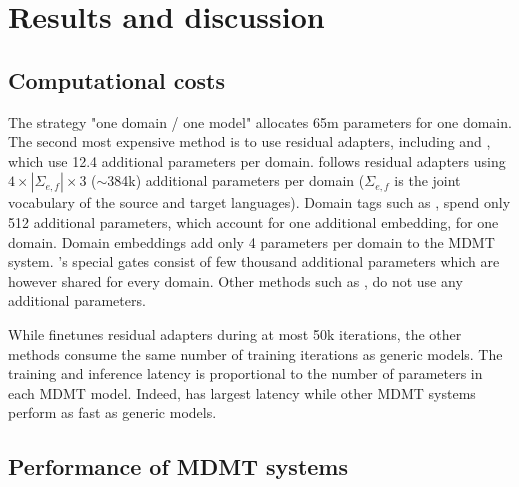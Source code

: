 \section{Results and discussion \label{sec:results-chap4}}

\subsection{Computational costs}
\label{ssec:cost-chap4}
The strategy "one domain / one model" allocates 65m parameters for one domain. The second most expensive method is to use residual adapters, including  and , which use 12.4 additional parameters per domain.  follows residual adapters using $4 \times |\Sigma_{e,f}| \times 3$ ($\sim$384k) additional parameters per domain ($\Sigma_{e,f}$ is the joint vocabulary of the source and target languages). Domain tags such as ,  spend only 512 additional parameters, which account for one additional embedding, for one domain. Domain embeddings  add only 4 parameters per domain to the MDMT system. 's special gates consist of few thousand additional parameters which are however shared for every domain. Other methods such as ,  do not use any additional parameters.

While  finetunes residual adapters during at most 50k iterations, the other methods consume the same number of training iterations as generic models. The training and inference latency is proportional to the number of parameters in each MDMT model. Indeed,  has largest latency while other MDMT systems perform as fast as generic models.
\subsection{Performance of MDMT systems \label{ssec:rawperformance-chap4}}


